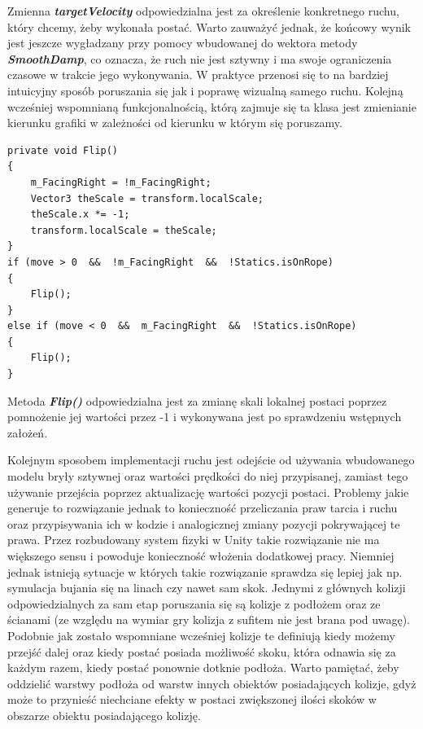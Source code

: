 \documentclass[oneside,polski,logo]{amuthesis}
\begin{document}
Zmienna \textbf{\textit{targetVelocity}} odpowiedzialna jest za określenie konkretnego ruchu, który chcemy, żeby wykonała postać. Warto zauważyć jednak, że końcowy wynik jest jeszcze wygładzany przy pomocy wbudowanej do wektora metody \textbf{\textit{SmoothDamp}}, co oznacza, że ruch nie jest sztywny i ma swoje ograniczenia czasowe w trakcie jego wykonywania. W praktyce przenosi się to na bardziej intuicyjny sposób poruszania się jak i poprawę wizualną samego ruchu.
Kolejną wcześniej wspomnianą funkcjonalnością, którą zajmuje się ta klasa jest zmienianie kierunku grafiki w zależności od kierunku w którym się poruszamy.

\begin{lstlisting}[breaklines=true,
language={[Sharp]C},
rulecolor=\color{blue!80!black},
caption={Fragment klasy \texttt{CharacterController.cs}}
]
private void Flip()
{
	m_FacingRight = !m_FacingRight;
	Vector3 theScale = transform.localScale;
	theScale.x *= -1;
	transform.localScale = theScale;
}
if (move > 0  &&  !m_FacingRight  &&  !Statics.isOnRope)
{
	Flip();
}
else if (move < 0  &&  m_FacingRight  &&  !Statics.isOnRope)
{ 
	Flip();
}
\end{lstlisting}

Metoda \textbf{\textit{Flip()}} odpowiedzialna jest za zmianę skali lokalnej postaci poprzez pomnożenie jej wartości przez -1 i wykonywana jest po sprawdzeniu wstępnych założeń.

Kolejnym sposobem implementacji ruchu jest odejście od używania wbudowanego modelu bryły sztywnej oraz wartości prędkości do niej przypisanej, zamiast tego używanie przejścia poprzez aktualizację wartości pozycji postaci. Problemy jakie generuje to rozwiązanie jednak to konieczność przeliczania praw tarcia i ruchu oraz przypisywania ich w kodzie i analogicznej zmiany pozycji pokrywającej te prawa. Przez rozbudowany system fizyki w Unity takie rozwiązanie nie ma większego sensu i powoduje konieczność włożenia dodatkowej pracy. Niemniej jednak istnieją sytuacje w których takie rozwiązanie sprawdza się lepiej jak np. symulacja bujania się na linach czy nawet sam skok.
Jednymi z głównych kolizji odpowiedzialnych za sam etap poruszania się są kolizje z podłożem oraz ze ścianami (ze względu na wymiar gry kolizja z sufitem nie jest brana pod uwagę). Podobnie jak zostało wspomniane wcześniej kolizje te definiują kiedy możemy przejść dalej oraz kiedy postać posiada możliwość skoku, która odnawia się za każdym razem, kiedy postać ponownie dotknie podłoża. Warto pamiętać, żeby oddzielić warstwy podłoża od warstw innych obiektów posiadających kolizje, gdyż może to przynieść niechciane efekty w postaci zwiększonej ilości skoków w obszarze obiektu posiadającego kolizję.
\end{document}
